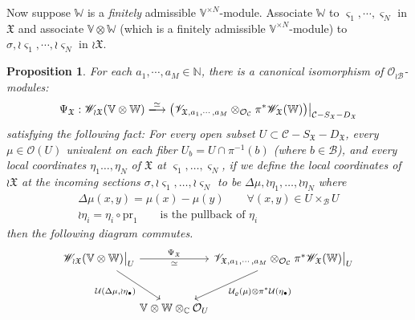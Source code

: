 \documentclass[11pt,b5paper,notitlepage]{article}
\theoremstyle{definition}
\theoremstyle{plain}
\newtheorem{pp}[df]{Proposition}
\newcommand{\fk}{\mathfrak}
\newcommand{\mc}{\mathcal}
\newcommand{\SV}{\mathscr{V}}
\newcommand{\sgm}{\varsigma}
\newcommand{\SX}{{S_{\fk X}}}
\newcommand{\DX}{D_{\fk X}}
\newcommand{\Vbb}{\mathbb V}
\newcommand{\Wbb}{\mathbb W}
\newcommand{\Cbb}{\mathbb C}
\newcommand{\Nbb}{\mathbb N}
\newcommand{\pr}{\mathrm {pr}}
\newcommand{\<}{\left\langle}
\renewcommand{\>}{\right\rangle}
\newcommand{\MO}{\mathcal{O}}
\newcommand{\MC}{\mathcal{C}}
\newcommand{\MB}{\mathcal{B}}
\newcommand{\fx}{\mathfrak{X}}
\newcommand{\SW}{\mathscr{W}}
\numberwithin{equation}{section}
\begin{document}
Now suppose $\Wbb$ is a \textit{finitely} admissible $\Vbb^{\times N}$-module. Associate $\Wbb$ to $\varsigma_1,\cdots,\varsigma_N$ in $\fx$ and associate $\Vbb\otimes\Wbb$ (which is a finitely admissible $\Vbb^{\times N}$-module) to $\sigma,\wr \varsigma_1,\cdots,\wr\varsigma_N$ in $\wr\fx$. 
\begin{pp}\label{equivalence3}
   For each $a_1,\cdots,a_M\in \Nbb$, there is a canonical isomorphism of $\MO_{\wr \MB}$-modules:
\begin{gather}
\Psi_{\fk X}:   \SW_{\wr\fx}(\Vbb\otimes \Wbb)\xlongrightarrow{\simeq} \big(\SV_{\fx,a_1,\cdots,a_M}\otimes_{\mc O_{\mc C}} \pi^*\SW_\fx(\Wbb)\big)\big|_{\MC-S_\fx-D_\fx}  \label{eq52}
\end{gather}
satisfying the following fact: For every open subset $U\subset\mc C-\SX-\DX$, every  $\mu\in\mc O(U)$ univalent on each fiber $U_b=U\cap\pi^{-1}(b)$ (where $b\in\mc B$), and every  local coordinates $\eta_1\dots,\eta_N$ of $\fk X$ at $\sgm_1,\dots,\sgm_N$, if we define the local coordinates of $\wr{\fk X}$ at the incoming sections $\sigma,\wr\sgm_1,\dots,\wr\sgm_N$ to be $\Delta\mu,\wr\eta_1,\dots,\wr\eta_N$ where
\begin{subequations}\label{eq49}
\begin{gather}
\Delta\mu(x,y)=\mu(x)-\mu(y)\qquad \forall (x,y)\in U\times_\MB U\\
\wr\eta_i=\eta_i\circ\pr_1\qquad\text{is the pullback of }\eta_i
\end{gather}
\end{subequations}
then the following diagram commutes.
   \begin{equation}\label{eq55}
\begin{tikzcd}[column sep=-0.5ex, row sep=3ex]
\mathscr{W}_{\wr\mathfrak{X}}(\mathbb{V}\otimes \mathbb{W})\big|_U \arrow[rrrr, "\Psi_\mathfrak{X}","\simeq"'] \arrow[rrdd, "{\mathcal{U}(\Delta\mu,\wr\eta_\bullet)}"'] &  &                                                    &  & \mathscr{V}_{\mathfrak{X},a_1,\cdots,a_M}\otimes_{\mc O_{\mc C}} \pi^*\mathscr{W}_\mathfrak{X}(\mathbb{W})\big|_U  \arrow[lldd, "\mathcal{U}_\varrho(\mu)\otimes \pi^*\mathcal{U}(\eta_\bullet)"] \\
                                                                                                                                                               &  &                                                    &  &                                                                                                                                                                      \\
                                                                                                                                                               &  & \mathbb{V}\otimes \mathbb{W} \otimes_\Cbb \mathcal{O}_U &  &                                                                                                                                                                     
\end{tikzcd}
\end{equation}
\end{pp}
\end{document}
